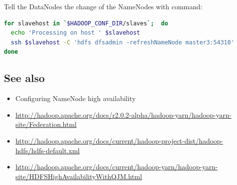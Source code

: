 Tell the DataNodes the change of the NameNodes with command:
\lstset{style=bashstyle}
\begin{lstlisting}[language=bash]
for slavehost in `$HADOOP_CONF_DIR/slaves`;  do
  echo 'Processing on host ' $slavehost
  ssh $slavehost -C 'hdfs dfsadmin -refreshNameNode master3:54310'
done
\end{lstlisting}

\subsection*{See also}
\begin{itemize}
  \item Configuring NameNode high availability
  \item \url{http://hadoop.apache.org/docs/r2.0.2-alpha/hadoop-yarn/hadoop-yarn-site/Federation.html}
  \item \url{http://hadoop.apache.org/docs/current/hadoop-project-dist/hadoop-hdfs/hdfs-default.xml}
  \item \url{http://hadoop.apache.org/docs/current/hadoop-yarn/hadoop-yarn-site/HDFSHighAvailabilityWithQJM.html}
\end{itemize}
